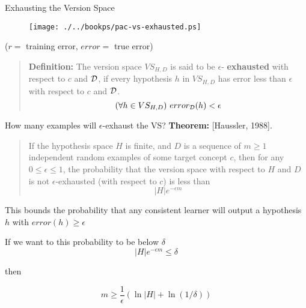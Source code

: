 \documentclass[%
pdf,
colorBG,
slideColor,
tcrico,
]{prosper}
\begin{document}


\begin{slide}{Exhausting the Version Space }
\tiny 

\begin{figure}
	\centering
	\texttt{[image: ./../bookps/pac-vs-exhausted.ps]}
\end{figure}

\centerline{($r =$ training error, $error = $ true error)}

\begin{quote}
{\bf Definition:} The version space $VS_{H,D}$ is said to be $\epsilon$-{\bf
 exhausted} with respect to $c$ and $\cal D$, if every hypothesis $h$ in
 $VS_{H,D}$ has error less than $\epsilon$ with respect to $c$ and $\cal D$.
\[(\forall h \in VS_{H,D})\  error_{\cal D}(h) < \epsilon \]
\end{quote}
\end{slide}


\begin{slide}{\normalsize How many examples will $\epsilon$-exhaust the VS? }
\tiny 
{\bf Theorem:} [Haussler, 1988].
\begin{quote}

If the hypothesis space $H$ is finite, and $D$ is a sequence of $m \geq 1$
independent random examples of some target concept $c$, then for any $0 \leq
\epsilon \leq 1$, the probability that the version space with respect to $H$
and $D$ is not $\epsilon$-exhausted (with respect to $c$) is less than \[|H|
e^{-\epsilon m} \]
\end{quote}

This bounds the probability that any consistent learner will output a hypothesis $h$ with $error(h) \geq \epsilon$

If we want to this probability to be below $\delta$ \[|H|e^{- \epsilon m} \leq \delta  \]

then

\[m \geq \frac{1}{\epsilon}(\ln|H| + \ln(1/\delta)) \]
\end{slide}

\end{document}
